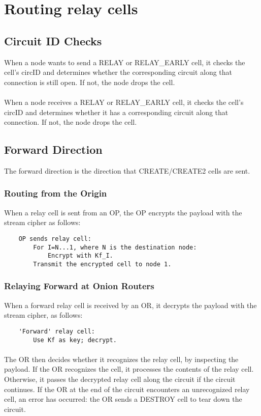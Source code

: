 \section{Routing relay cells}

\subsection{Circuit ID Checks}

When a node wants to send a RELAY or RELAY\_EARLY cell, it checks the cell's
circID and determines whether the corresponding circuit along that
connection is still open. If not, the node drops the cell.

\paragraph{}
When a node receives a RELAY or RELAY\_EARLY cell, it checks the cell's
circID and determines whether it has a corresponding circuit along
that connection. If not, the node drops the cell.

\subsection{Forward Direction}
The forward direction is the direction that CREATE/CREATE2 cells
are sent.

\subsubsection{Routing from the Origin}
When a relay cell is sent from an OP, the OP encrypts the payload
with the stream cipher as follows:

\begin{verbatim}
    OP sends relay cell:
        For I=N...1, where N is the destination node:
            Encrypt with Kf_I.
        Transmit the encrypted cell to node 1.
\end{verbatim}


\subsubsection{Relaying Forward at Onion Routers}
When a forward relay cell is received by an OR, it decrypts the payload
with the stream cipher, as follows:
\begin{verbatim}
    'Forward' relay cell:
        Use Kf as key; decrypt.
\end{verbatim}

\paragraph{}
The OR then decides whether it recognizes the relay cell, by
inspecting the payload. If the OR
recognizes the cell, it processes the contents of the relay cell.
Otherwise, it passes the decrypted relay cell along the circuit if
the circuit continues. If the OR at the end of the circuit
encounters an unrecognized relay cell, an error has occurred: the OR
sends a DESTROY cell to tear down the circuit.

